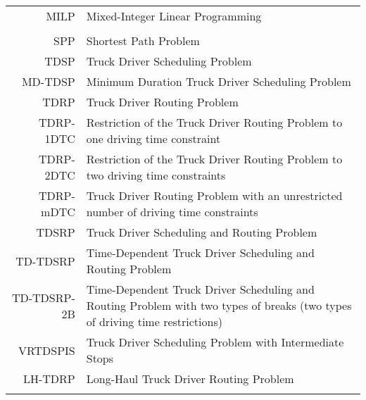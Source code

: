 \begin{tabular}{rp{}}
	MILP        & Mixed-Integer Linear Programming                                                                                             \\
	\vspace{2\baselineskip}                                                                                                                    \\
	SPP         & Shortest Path Problem                                                                                                        \\
	TDSP        & Truck Driver Scheduling Problem                                                                                              \\
	MD-TDSP     & Minimum Duration Truck Driver Scheduling Problem                                                                             \\
	TDRP        & Truck Driver Routing Problem                                                                                                 \\
	TDRP-1DTC   & Restriction of the Truck Driver Routing Problem to one driving time constraint                                               \\
	TDRP-2DTC   & Restriction of the Truck Driver Routing Problem to two driving time constraints                                              \\
	TDRP-mDTC   & Truck Driver Routing Problem with an unrestricted number of driving time constraints                                         \\
	TDSRP       & Truck Driver Scheduling and Routing Problem                                                                                  \\
	TD-TDSRP    & Time-Dependent Truck Driver Scheduling and Routing Problem                                                                   \\
	TD-TDSRP-2B & Time-Dependent Truck Driver Scheduling and Routing Problem with two types of breaks (two types of driving time restrictions) \\
	VRTDSPIS    & Truck Driver Scheduling Problem with Intermediate Stops                                                                      \\
	LH-TDRP     & Long-Haul Truck Driver Routing Problem                                                                                       \\
	\vspace{2\baselineskip}
\end{tabular}



